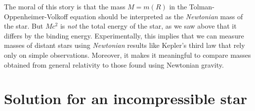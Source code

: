 The moral of this story is that the mass $M = m(R)$ in the Tolman-Oppenheimer-Volkoff equation should be interpreted as the \emph{Newtonian} mass of the star.
But $M c^2$ is \emph{not} the total energy of the star, as we saw above that it differs by the binding energy.
Experimentally, this implies that we can measure masses of distant stars using \emph{Newtonian} results like Kepler's third law \cite[chapter 19]{ref:mtw} that rely only on simple observations.
Moreover, it makes it meaningful to compare masses obtained from general relativity to those found using Newtonian gravity.
\section{Solution for an incompressible star}
\label{sec:incompressible_star}



